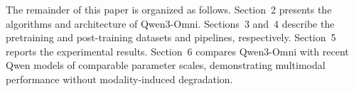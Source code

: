 
The remainder of this paper is organized as follows. Section~2 presents the algorithms and architecture of Qwen3-Omni. Sections~3 and~4 describe the pretraining and post-training datasets and pipelines, respectively. Section~5 reports the experimental results. Section~6 compares Qwen3-Omni with recent Qwen models of comparable parameter scales, demonstrating multimodal performance without modality-induced degradation. 



